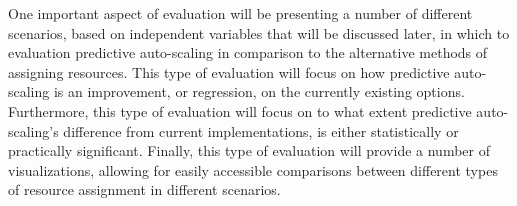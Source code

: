 One important aspect of evaluation will be presenting a number of different
scenarios, based on independent variables that will be discussed later, in which
to evaluation predictive auto-scaling in comparison to the alternative methods
of assigning resources. This type of evaluation will focus on how predictive
auto-scaling is an improvement, or regression, on the currently existing
options. Furthermore, this type of evaluation will focus on to what extent
predictive auto-scaling's difference from current implementations,
is either statistically or practically significant. Finally, this type of evaluation will
provide a number of visualizations, allowing for easily accessible comparisons
between different types of resource assignment in different scenarios.
